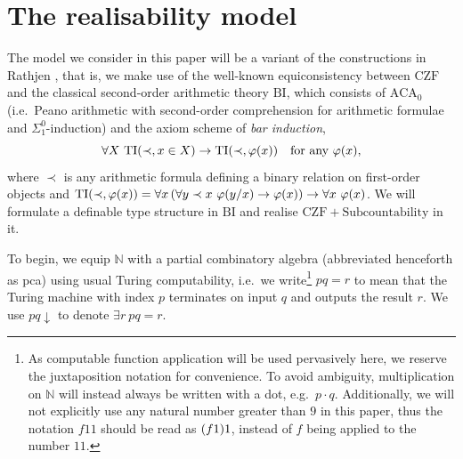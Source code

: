 \documentclass[preprint]{elsarticle}
\theoremstyle{plain}
\begin{document}
\section{The realisability model}
\label{sec:real-model}

The model we consider in this paper will be a variant of the constructions in Rathjen \cite{rathjen14-czf-lpo}, that is, we make use of the well-known equiconsistency between $\mathrm{CZF}$ and the classical second-order arithmetic theory $\mathrm{BI}$, which consists of $\mathrm{ACA}_0$ (i.e.\ Peano arithmetic with second-order comprehension for arithmetic formulae and $\Sigma^0_1$-induction) and the axiom scheme of \emph{bar induction},
\[\forall X \ \mathrm{TI}\mleft(\prec, x \in X\mright) \rightarrow \mathrm{TI}\mleft(\prec, \varphi\mleft(x\mright)\mright) \quad \text{for any $\varphi\mleft(x\mright)$},\]
where $\prec$ is any arithmetic formula defining a binary relation on first-order objects and $\mathrm{TI}\mleft(\prec, \varphi\mleft(x\mright)\mright) = \forall x \left(\forall y \prec x \ \varphi\mleft(y/x\mright) \rightarrow \varphi\mleft(x\mright)\right) \rightarrow \forall x \ \varphi\mleft(x\mright)$. We will formulate a definable type structure in $\mathrm{BI}$ and realise $\mathrm{CZF} + \text{Subcountability}$ in it.

To begin, we equip $\mathbb{N}$ with a partial combinatory algebra (abbreviated henceforth as pca) using usual Turing computability, i.e.\ we write\footnote{As computable function application will be used pervasively here, we reserve the juxtaposition notation for convenience. To avoid ambiguity, multiplication on $\mathbb{N}$ will instead always be written with a dot, e.g.\ $p \cdot q$. Additionally, we will not explicitly use any natural number greater than $9$ in this paper, thus the notation $f11$ should be read as $\mleft(f1\mright)1$, instead of $f$ being applied to the number $11$.} $pq = r$ to mean that the Turing machine with index $p$ terminates on input $q$ and outputs the result $r$. We use $pq {\downarrow}$ to denote $\exists r \ pq = r$.
\end{document}
